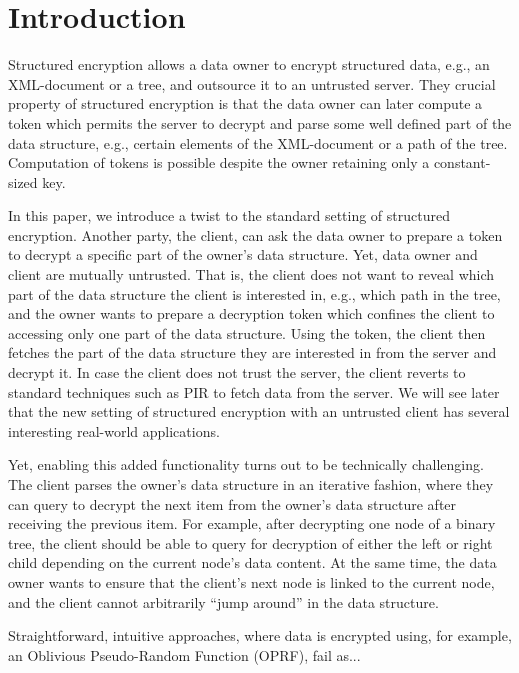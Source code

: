 \section{Introduction}
Structured encryption allows a data owner to encrypt structured data,
e.g., an XML-document or a tree, and outsource it to an untrusted
server.  They crucial property of structured encryption is that the
data owner can later compute a token which permits the server to
decrypt and parse some well defined part of the data structure, e.g.,
certain elements of the XML-document or a path of the
tree. Computation of tokens is possible despite the owner retaining
only a constant-sized key.

In this paper, we introduce a twist to the standard setting of
structured encryption. Another party, the client, can ask the data
owner to prepare a token to decrypt a specific part of the owner's
data structure. Yet, data owner and client are mutually
untrusted. That is, the client does not want to reveal which part of
the data structure the client is interested in, e.g., which path in
the tree, and the owner wants to prepare a decryption token which
confines the client to accessing only one part of the data
structure. Using the token, the client then fetches the part of the
data structure they are interested in from the server and decrypt
it. In case the client does not trust the server, the client reverts
to standard techniques such as PIR to fetch data from the server. We
will see later that the new setting of structured encryption with an
untrusted client has several interesting real-world applications.

Yet, enabling this added functionality turns out to be technically
challenging. The client parses the owner's data structure in an
iterative fashion, where they can query to decrypt the next item from
the owner's data structure after receiving the previous item.  For
example, after decrypting one node of a binary tree, the client should
be able to query for decryption of either the left or right child
depending on the current node's data content.  At the same time, the
data owner wants to ensure that the client's next node is linked to
the current node, and the client cannot arbitrarily ``jump around'' in
the data structure.

Straightforward, intuitive approaches, where data
is encrypted using, for example, an Oblivious Pseudo-Random Function
(OPRF), fail as...
